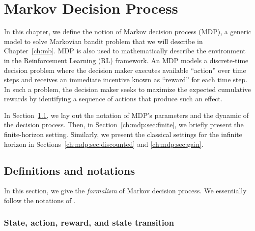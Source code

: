 \begingroup

\let\clearpage\relax

\chapter{Markov Decision Process}
\label{ch:mdp}


In this chapter, we define the notion of Markov decision process (MDP), a generic model to solve Markovian bandit problem that we will describe in Chapter~\ref{ch:mb}.
MDP is also used to mathematically describe the environment in the Reinforcement Learning (RL) framework.
An MDP models a discrete-time decision problem where the decision maker executes available ``action'' over time steps and receives an immediate incentive known as ``reward'' for each time step.
In such a problem, the decision maker seeks to maximize the expected cumulative rewards by identifying a sequence of actions that produce such an effect.

In Section~\ref{ch:mdp:sec:defn}, we lay out the notation of MDP's parameters and the dynamic of the decision process.
Then, in Section~\ref{ch:mdp:sec:finite}, we briefly present the finite-horizon setting.
Similarly, we present the classical settings for the infinite horizon in Sections~\ref{ch:mdp:sec:discounted} and \ref{ch:mdp:sec:gain}.


\section{Definitions and notations}
\label{ch:mdp:sec:defn}

In this section, we give the \emph{formalism} of Markov decision process. %
We essentially follow the notations of \cite{puterman2014markov}.

\subsection{State, action, reward, and state transition}

